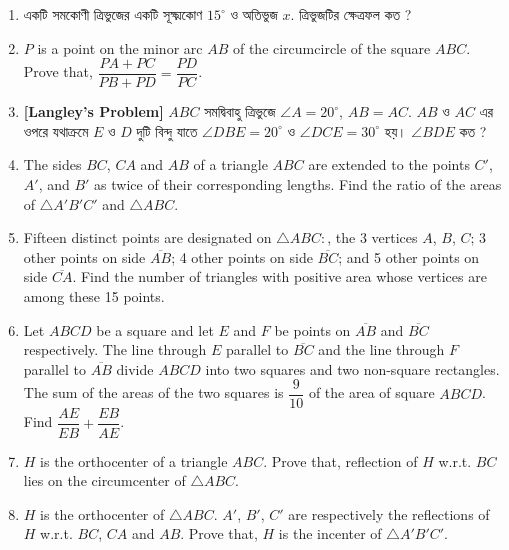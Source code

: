 \documentclass[11pt, a4paper]{article}
\begin{document}
\begin{enumerate}
	\item \textbengali{একটি সমকোণী ত্রিভুজের একটি সূক্ষ্মকোণ} $15^{\circ}$ \textbengali{ও অতিভুজ} $x$. \textbengali{ত্রিভুজটির ক্ষেত্রফল কত ?}
	
	\item $P$ is a point on the minor arc $AB$ of the circumcircle of the square $ABC$. Prove that, $\dfrac{PA + PC}{PB+PD} = \dfrac{PD}{PC}$.
	
	\item \textbf{[Langley's Problem]} $ABC$ \textbengali{সমদ্বিবাহু ত্রিভুজে} $\angle A = 20^{\circ}$, $AB = AC$. $AB$ \textbengali{ও} $AC$ \textbengali{এর ওপরে যথাক্রমে} $E$ \textbengali{ও} $D$ \textbengali{দুটি বিন্দু যাতে} $\angle DBE = 20^{\circ}$ \textbengali{ও} $\angle DCE = 30^{\circ}$ \textbengali{হয়।} $\angle BDE$ \textbengali{কত ?}
	
	\item The sides $BC$, $CA$ and $AB$ of a triangle $ABC$ are extended to the points $C'$, $A'$, and $B'$ as twice of their corresponding lengths. Find the ratio of the areas of $\bigtriangleup A'B'C'$ and $\bigtriangleup ABC$.
	
	\item Fifteen distinct points are designated on $\bigtriangleup ABC :$, the 3 vertices $A$, $B$, $C$; 3 other points on side $\overline{AB}$; 4 other points on side $\overline{BC}$; and 5 other points on side $\overline{CA}$. Find the number of triangles with positive area whose vertices are among these 15 points.
	
	\item Let $ABCD$ be a square and let $E$ and $F$ be points on $\overline{AB}$ and $\overline{BC}$ respectively. The line through $E$ parallel to $\overline{BC}$ and the line through $F$ parallel to $\overline{AB}$ divide $ABCD$ into two squares and two non-square rectangles. The sum of the areas of the two squares is $\dfrac{9}{10}$ of the area of square $ABCD$. Find $\dfrac{AE}{EB} + \dfrac{EB}{AE}$.

	\item $H$ is the orthocenter of a triangle $ABC$. Prove that, reflection of $H$ w.r.t. $BC$ lies on the circumcenter of $\bigtriangleup ABC$.
	
	\item $H$ is the orthocenter of $\bigtriangleup ABC$. $A'$, $B'$, $C'$ are respectively the reflections of $H$ w.r.t. $BC$, $CA$ and $AB$. Prove that, $H$ is the incenter of $\bigtriangleup A'B'C'$.
	

\end{enumerate}
\end{document}

